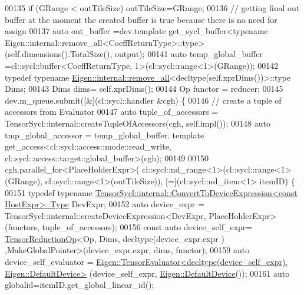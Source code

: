 \begin{DoxyCode}
00135     \textcolor{keywordflow}{if} (GRange < outTileSize) outTileSize=GRange;
00136     \textcolor{comment}{// getting final out buffer at the moment the created buffer is true because there is no need for
       assign}
00137     \textcolor{keyword}{auto} out\_buffer =dev.template get\_sycl\_buffer<typename
       Eigen::internal::remove\_all<CoeffReturnType>::type>(\textcolor{keyword}{self}.dimensions().TotalSize(), output);
00141     \textcolor{keyword}{auto} temp\_global\_buffer =cl::sycl::buffer<CoeffReturnType, 1>(cl::sycl::range<1>(GRange));
00142     \textcolor{keyword}{typedef} \textcolor{keyword}{typename} \hyperlink{struct_eigen_1_1internal_1_1remove__all}{Eigen::internal::remove\_all}<decltype(\textcolor{keyword}{self}.xprDims())>::type
       Dims;
00143     Dims dims= \textcolor{keyword}{self}.xprDims();
00144     Op functor = reducer;
00145     dev.m\_queue.submit([&](cl::sycl::handler &cgh) \{
00146       \textcolor{comment}{// create a tuple of accessors from Evaluator}
00147       \textcolor{keyword}{auto} tuple\_of\_accessors =  TensorSycl::internal::createTupleOfAccessors(cgh, \textcolor{keyword}{self}.impl());
00148       \textcolor{keyword}{auto} tmp\_global\_accessor = temp\_global\_buffer. \textcolor{keyword}{template} 
      get\_access<cl::sycl::access::mode::read\_write, cl::sycl::access::target::global\_buffer>(cgh);
00149 
00150       cgh.parallel\_for<PlaceHolderExpr>( cl::sycl::nd\_range<1>(cl::sycl::range<1>(GRange), 
      cl::sycl::range<1>(outTileSize)), [=](cl::sycl::nd\_item<1> itemID) \{
00151         \textcolor{keyword}{typedef} \textcolor{keyword}{typename} 
      \hyperlink{struct_eigen_1_1_tensor_sycl_1_1internal_1_1_convert_to_device_expression}{TensorSycl::internal::ConvertToDeviceExpression<const HostExpr>::Type}
       DevExpr;
00152         \textcolor{keyword}{auto} device\_expr = TensorSycl::internal::createDeviceExpression<DevExpr, PlaceHolderExpr>(functors,
       tuple\_of\_accessors);
00156         \textcolor{keyword}{const} \textcolor{keyword}{auto} device\_self\_expr= \hyperlink{class_eigen_1_1_tensor_reduction_op}{TensorReductionOp}<Op, Dims, decltype(device\_expr.expr
      ) ,MakeGlobalPointer>(device\_expr.expr, dims, functor);
00159         \textcolor{keyword}{auto} device\_self\_evaluator = 
      \hyperlink{struct_eigen_1_1_tensor_evaluator}{Eigen::TensorEvaluator<decltype(device\_self\_expr), Eigen::DefaultDevice>}
      (device\_self\_expr, \hyperlink{struct_eigen_1_1_default_device}{Eigen::DefaultDevice}());
00161         \textcolor{keyword}{auto} globalid=itemID.get\_global\_linear\_id();

\end{DoxyCode}
